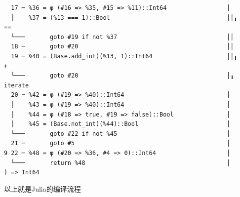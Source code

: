 \begin{lstlisting}
  17 ─ %36 = φ (#16 => %35, #15 => %11)::Int64                 │    
  │    %37 = (%13 === 1)::Bool                                 ││╻    == 
  └───       goto #19 if not %37                               ││   
  18 ─       goto #20                                          ││   
  19 ─ %40 = (Base.add_int)(%13, 1)::Int64                     ││╻    +
  └───       goto #20                                          │╻    iterate
  20 ┄ %42 = φ (#19 => %40)::Int64                             │    
  │    %43 = φ (#19 => %40)::Int64                             │    
  │    %44 = φ (#18 => true, #19 => false)::Bool               │    
  │    %45 = (Base.not_int)(%44)::Bool                         │    
  └───       goto #22 if not %45                               │    
  21 ─       goto #5                                           │    
9 22 ─ %48 = φ (#20 => %36, #4 => 0)::Int64                    │    
  └───       return %48                                        │    
) => Int64
\end{lstlisting}

以上就是Julia的编译流程
